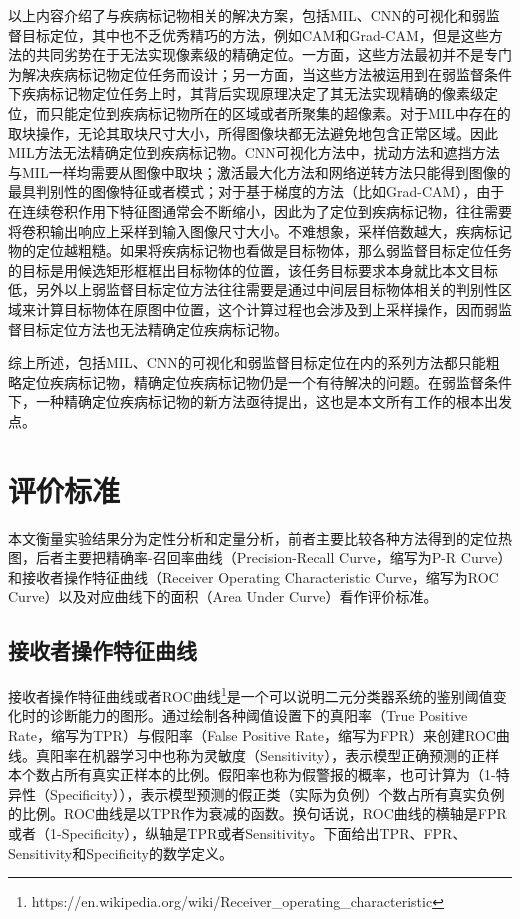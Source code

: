 以上内容介绍了与疾病标记物相关的解决方案，包括MIL、CNN的可视化和弱监督目标定位，其中也不乏优秀精巧的方法，例如CAM和Grad-CAM，但是这些方法的共同劣势在于无法实现像素级的精确定位。一方面，这些方法最初并不是专门为解决疾病标记物定位任务而设计；另一方面，当这些方法被运用到在弱监督条件下疾病标记物定位任务上时，其背后实现原理决定了其无法实现精确的像素级定位，而只能定位到疾病标记物所在的区域或者所聚集的超像素。对于MIL中存在的取块操作，无论其取块尺寸大小，所得图像块都无法避免地包含正常区域。因此MIL方法无法精确定位到疾病标记物。CNN可视化方法中，扰动方法和遮挡方法与MIL一样均需要从图像中取块；激活最大化方法和网络逆转方法只能得到图像的最具判别性的图像特征或者模式；对于基于梯度的方法（比如Grad-CAM），由于在连续卷积作用下特征图通常会不断缩小，因此为了定位到疾病标记物，往往需要将卷积输出响应上采样到输入图像尺寸大小。不难想象，采样倍数越大，疾病标记物的定位越粗糙。如果将疾病标记物也看做是目标物体，那么弱监督目标定位任务的目标是用候选矩形框框出目标物体的位置，该任务目标要求本身就比本文目标低，另外以上弱监督目标定位方法往往需要是通过中间层目标物体相关的判别性区域来计算目标物体在原图中位置，这个计算过程也会涉及到上采样操作，因而弱监督目标定位方法也无法精确定位疾病标记物。

综上所述，包括MIL、CNN的可视化和弱监督目标定位在内的系列方法都只能粗略定位疾病标记物，精确定位疾病标记物仍是一个有待解决的问题。在弱监督条件下，一种精确定位疾病标记物的新方法亟待提出，这也是本文所有工作的根本出发点。
\section{评价标准}\label{sec:evaluation_metrics}
本文衡量实验结果分为定性分析和定量分析，前者主要比较各种方法得到的定位热图，后者主要把精确率-召回率曲线（Precision-Recall Curve，缩写为P-R Curve）和接收者操作特征曲线（Receiver Operating Characteristic Curve，缩写为ROC Curve）以及对应曲线下的面积（Area Under Curve）看作评价标准。
\subsection{接收者操作特征曲线}\label{subsec:roc_curve}
接收者操作特征曲线或者ROC曲线\footnote{https://en.wikipedia.org/wiki/Receiver\_operating\_characteristic}是一个可以说明二元分类器系统的鉴别阈值变化时的诊断能力的图形。通过绘制各种阈值设置下的真阳率（True Positive Rate，缩写为TPR）与假阳率（False Positive Rate，缩写为FPR）来创建ROC曲线。真阳率在机器学习中也称为灵敏度（Sensitivity），表示模型正确预测的正样本个数占所有真实正样本的比例。假阳率也称为假警报的概率，也可计算为（1-特异性（Specificity）），表示模型预测的假正类（实际为负例）个数占所有真实负例的比例。ROC曲线是以TPR作为衰减的函数。换句话说，ROC曲线的横轴是FPR或者（1-Specificity），纵轴是TPR或者Sensitivity。下面给出TPR、FPR、Sensitivity和Specificity的数学定义。

